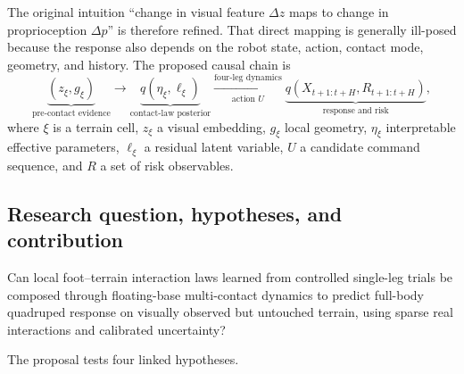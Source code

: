 The original intuition ``change in visual feature $\Delta z$ maps to change in proprioception $\Delta p$'' is therefore refined. That direct mapping is generally ill-posed because the response also depends on the robot state, action, contact mode, geometry, and history. The proposed causal chain is
\begin{equation}
\underbrace{(z_\xi,g_\xi)}_{\text{pre-contact evidence}}
\longrightarrow
\underbrace{q(\eta_\xi,\ell_\xi)}_{\text{contact-law posterior}}
\xrightarrow[\text{action }U]{\text{four-leg dynamics}}
\underbrace{q(X_{t+1:t+H},R_{t+1:t+H})}_{\text{response and risk}},
\label{eq:causal_chain}
\end{equation}
where $\xi$ is a terrain cell, $z_\xi$ a visual embedding, $g_\xi$ local geometry, $\eta_\xi$ interpretable effective parameters, $\ell_\xi$ a residual latent variable, $U$ a candidate command sequence, and $R$ a set of risk observables.

\subsection{Research question, hypotheses, and contribution}

\begin{keybox}
Can local foot--terrain interaction laws learned from controlled single-leg trials be composed through floating-base multi-contact dynamics to predict full-body quadruped response on visually observed but untouched terrain, using sparse real interactions and calibrated uncertainty?
\end{keybox}

The proposal tests four linked hypotheses.

